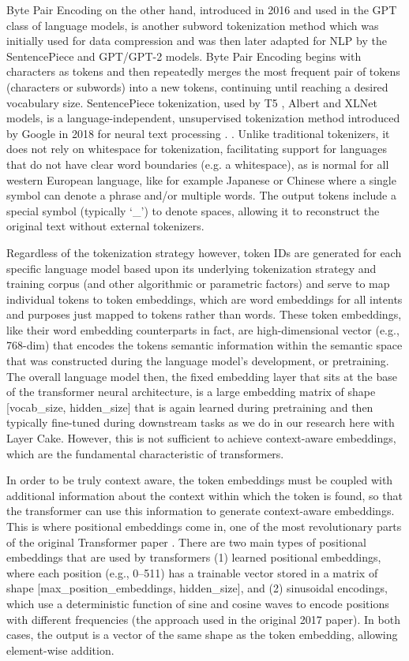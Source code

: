 \documentclass[final]{clv2025}
\begin{document}
Byte Pair Encoding on the other hand, introduced in 2016 \cite{sennrich-etal-2016-neural} and used in the GPT class of language models, is another subword tokenization method which was initially used for data compression and was then later adapted for NLP by the SentencePiece and GPT/GPT-2 models. Byte Pair Encoding begins with characters as tokens and then repeatedly merges the most frequent pair of tokens (characters or subwords) into a new tokens, continuing until reaching a desired vocabulary size. SentencePiece tokenization, used by T5 \cite{raffel2019exploring}, Albert \cite{lan2019albert} and XLNet \cite{yang2019xlnet} models, is a language-independent, unsupervised tokenization method introduced by Google in 2018 for neural text processing \cite{kudo2018sentencepiece}. . Unlike traditional tokenizers, it does not rely on whitespace for tokenization, facilitating support for languages that do not have clear word boundaries (e.g. a whitespace), as is normal for all western European language, like for example Japanese or Chinese where a single symbol can denote a phrase and/or multiple words. The output tokens include a special symbol (typically ‘\_’) to denote spaces, allowing it to reconstruct the original text without external tokenizers.

Regardless of the tokenization strategy however, token IDs are generated for each specific language model based upon its underlying tokenization strategy and training corpus (and other algorithmic or parametric factors) and serve to map individual tokens to token embeddings, which are word embeddings for all intents and purposes just mapped to tokens rather than words. These token embeddings, like their word embedding counterparts in fact, are high-dimensional vector (e.g., 768-dim) that encodes the tokens semantic information within the semantic space that was constructed during the language model’s development, or pretraining. The overall language model then, the fixed embedding layer that sits at the base of the transformer neural architecture, is a large embedding matrix of shape [vocab\_size, hidden\_size] that is again learned during pretraining and then typically fine-tuned during downstream tasks as we do in our research here with Layer Cake. However, this is not sufficient to achieve context-aware embeddings, which are the fundamental characteristic of transformers. 

In order to be truly context aware, the token embeddings must be coupled with additional information about the context within which the token is found, so that the transformer can use this information to generate context-aware embeddings. This is where positional embeddings come in, one of the most revolutionary parts of the original Transformer paper \cite{vaswani}. There are two main types of positional embeddings that are used by transformers (1) learned positional embeddings, where each position (e.g., 0–511) has a trainable vector stored in a matrix of shape [max\_position\_embeddings, hidden\_size], and (2) sinusoidal encodings, which use a deterministic function of sine and cosine waves to encode positions with different frequencies (the approach used in the original 2017 paper). In both cases, the output is a vector of the same shape as the token embedding, allowing element-wise addition.
\end{document}
